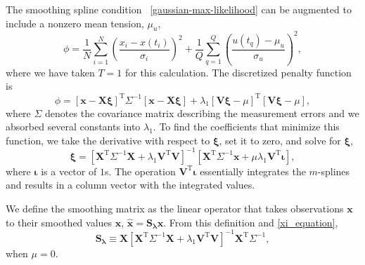 \documentclass{ametsoc}
\begin{document}
The smoothing spline condition~ \eqref{gaussian-max-likelihood} can be augmented to include a nonzero mean tension, $\mu_u$,
\begin{equation}
\phi =  \frac{1}{N} \sum^N _{i=1}\left( \frac{x_i - x(t_i)}{\sigma_i} \right)^2 + \frac{1}{Q} \sum^{Q}_{q=1}  \left(  \frac{u(t_q)-\mu_u}{\sigma_u} \right)^2,
\end{equation}
where we have taken $T=1$ for this calculation. The discretized penalty function is
\begin{equation}
\phi = \left[ \mathbf{x} - \mathbf{X} \mathbf{\xi} \right]^{\textrm{T}} \Sigma^{-1} \left[ \mathbf{x} - \mathbf{X} \mathbf{\xi}\right]
+ \lambda_1 \left[\mathbf{V}\mathbf{\xi} - \mu \right]^{\textrm{T}} \left[ \mathbf{V}\mathbf{\xi} - \mu \right],
\end{equation}
where $\Sigma$ denotes the covariance matrix describing the measurement errors and we absorbed several constants into $\lambda_1$. To find the coefficients that minimize this function, we take the derivative with respect to $\mathbf{\xi}$, set it to zero, and solve for $\mathbf{\xi}$,
\begin{equation}
\label{xi_equation}
\mathbf{\xi} = \left[ \mathbf{X}^{\textrm{T}} \Sigma^{-1} \mathbf{X} + \lambda_1 \mathbf{V}^{\textrm{T}} \mathbf{V} \right]^{-1}   \left[ \mathbf{X}^{\textrm{T}} \Sigma^{-1} \mathbf{x} +  \mu \lambda_1 \mathbf{V}^{\textrm{T}} \mathbf{\iota} \right],
\end{equation}
where $\mathbf{\iota}$ is a vector of $1$s. The operation $\mathbf{V}^{\textrm{T}} \mathbf{\iota}$ essentially integrates the $m$-splines and results in a column vector with the integrated values.

We define the smoothing matrix as the linear operator that takes observations $\mathbf{x}$ to their smoothed values $\mathbf{\hat{x}}$,
$
\mathbf{\hat{x}} = \mathbf{S_\lambda} \mathbf{x}.
$
From this definition and \eqref{xi_equation},
\begin{equation}
\label{smoothing-operator}
\mathbf{S_\lambda} \equiv \mathbf{X} \left[ \mathbf{X}^{\textrm{T}} \Sigma^{-1} \mathbf{X} + \lambda_1 \mathbf{V}^{\textrm{T}} \mathbf{V} \right]^{-1} \mathbf{X}^{\textrm{T}} \Sigma^{-1},
\end{equation}
when $\mu=0$.

\end{document}
